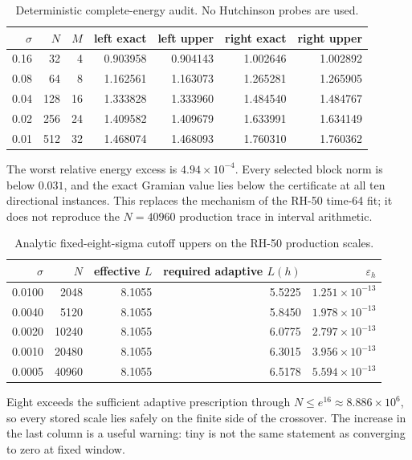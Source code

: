 \documentclass[11pt]{article}
\theoremstyle{remark}
\begin{document}
\begin{table}[H]
\centering
\caption{Deterministic complete-energy audit.  No Hutchinson probes are used.}
\label{tab:energy}
\begin{tabular}{rrrrrrr}
\toprule
\(\sigma\)&\(N\)&\(M\)&left exact&left upper&right exact&right upper\\
\midrule
0.16&32&4&0.903958&0.904143&1.002646&1.002892\\
0.08&64&8&1.162561&1.163073&1.265281&1.265905\\
0.04&128&16&1.333828&1.333960&1.484540&1.484767\\
0.02&256&24&1.409582&1.409679&1.633991&1.634149\\
0.01&512&32&1.468074&1.468093&1.760310&1.760362\\
\bottomrule
\end{tabular}
\end{table}

The worst relative energy excess is \(4.94\times10^{-4}\).  Every selected
block norm is below \(0.031\), and the exact Gramian value lies below the
certificate at all ten directional instances.  This replaces the mechanism
of the RH-50 time-64 fit; it does not reproduce the \(N=40960\) production
trace in interval arithmetic.

\begin{table}[H]
\centering
\caption{Analytic fixed-eight-sigma cutoff uppers on the RH-50 production
scales.}
\label{tab:cutoff}
\begin{tabular}{rrrrr}
\toprule
\(\sigma\)&\(N\)&effective \(L\)&required adaptive \(L(h)\)&\(\varepsilon_h\)\\
\midrule
0.0100&2048&8.1055&5.5225&\(1.251\times10^{-13}\)\\
0.0040&5120&8.1055&5.8450&\(1.978\times10^{-13}\)\\
0.0020&10240&8.1055&6.0775&\(2.797\times10^{-13}\)\\
0.0010&20480&8.1055&6.3015&\(3.956\times10^{-13}\)\\
0.0005&40960&8.1055&6.5178&\(5.594\times10^{-13}\)\\
\bottomrule
\end{tabular}
\end{table}

Eight exceeds the sufficient adaptive prescription through
\(N\le e^{16}\approx8.886\times10^6\), so every stored scale lies safely on
the finite side of the crossover.  The increase in the last column is a
useful warning: tiny is not the same statement as converging to zero at fixed
window.
\end{document}
